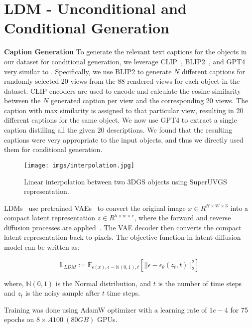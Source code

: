 \section{LDM - Unconditional and Conditional Generation}

\noindent\textbf{Caption Generation} To generate the relevant text captions for the objects in our dataset for conditional generation, we leverage CLIP~\cite{clip}, BLIP2~\cite{blip22023}, and GPT4~\cite{gpt42023} very similar to \cite{cap3d2024}. Specifically, we use BLIP2 to generate $N$ different captions for randomly selected 20 views from the 88 rendered views for each object in the dataset. CLIP encoders are used to encode and calculate the cosine similarity between the $N$ generated caption per view and the corresponding 20 views. The caption with max similarity is assigned to that particular view, resulting in 20 different captions for the same object. We now use GPT4 to extract a single caption distilling all the given 20 descriptions. We found that the resulting captions were very appropriate to the input objects, and thus we directly used them for conditional generation.


\begin{figure}[!h]
\centering
\texttt{[image: imgs/interpolation.jpg]} 
\caption{
Linear interpolation between two 3DGS objects using SuperUVGS representation.
}
\label{fig:interpolation}
\end{figure}


LDMs~\cite{stable_diffusion, ddim} use pretrained VAEs~\cite{transformer_vae} to convert the original image $x \in R^{H\times W\times 3}$ into a compact latent representation $z \in R^{h\times w\times c}$, where the forward and reverse diffusion processes are applied~\cite{stable_diffusion}. 
The VAE decoder then converts the compact latent representation back to pixels. 
The objective function in latent diffusion model can be written as:

\begin{equation}
    \mathbb{L}_{LDM} := \mathbb{E}_{\epsilon(x),\epsilon \sim \mathbb{N}(0,1), t } [ || \epsilon - \epsilon_\theta ( z_t, t ) ||_2^2 ]
\end{equation}

where, $\mathbb{N}(0,1)$ is the Normal distribution, and $t$ is the number of time steps and $z_t$ is the noisy sample after $t$ time steps.

Training was done using AdamW optimizer with a learning rate of $1e-4$ for 75 epochs on $8 \times A100 ~(80GB)$ GPUs. 

